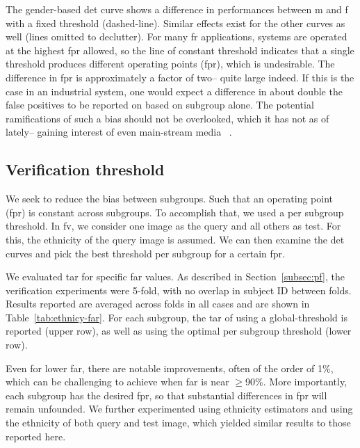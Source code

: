 The gender-based \gls{det} curve shows a difference in performances between \gls{m} and \gls{f} with a fixed threshold (dashed-line). Similar effects exist for the other curves as well (lines omitted to declutter). For many \gls{fr} applications, systems are operated at the highest \gls{fpr} allowed, so the line of constant threshold indicates that a single threshold produces different operating points (\ie \gls{fpr}), which is undesirable.  The difference in \gls{fpr} is approximately a factor of two-- quite large indeed. If this is the case in an industrial system, one would expect a difference in about double the false positives to be reported on based on subgroup alone. The potential ramifications of such a bias should not be overlooked, which it has not as of lately-- gaining interest of even main-stream media ~\cite{england2019,snow2018}.


\subsection{Verification threshold} \label{subsec:analysis:verification}
We seek to reduce the bias between subgroups. Such that an operating point (\ie \gls{fpr}) is constant across subgroups. To accomplish that, we used a per subgroup threshold. In \gls{fv}, we consider one image as the query and all others as test. For this, the ethnicity of the query image is assumed. We can then examine the \gls{det} curves and pick the best threshold per subgroup for a certain \gls{fpr}.

We evaluated \gls{tar} for specific \gls{far} values. As described in Section~\ref{subsec:pf}, the verification experiments were 5-fold, with no overlap in subject ID between folds. Results reported are averaged across folds in all cases and are shown in Table~\ref{tab:ethnicy-far}. For each subgroup, the \gls{tar} of using a global-threshold is reported (upper row), as well as using the optimal per subgroup threshold (lower row). 

Even for lower \gls{far}, there are notable improvements, often of the order of 1\%, which can be challenging to achieve when \gls{far} is near $\geq$90\%. More importantly, each subgroup has the desired \gls{fpr}, so that substantial differences in \gls{fpr} will remain unfounded. We further experimented using ethnicity estimators and using the ethnicity of both query and test image, which yielded similar results to those reported here.


